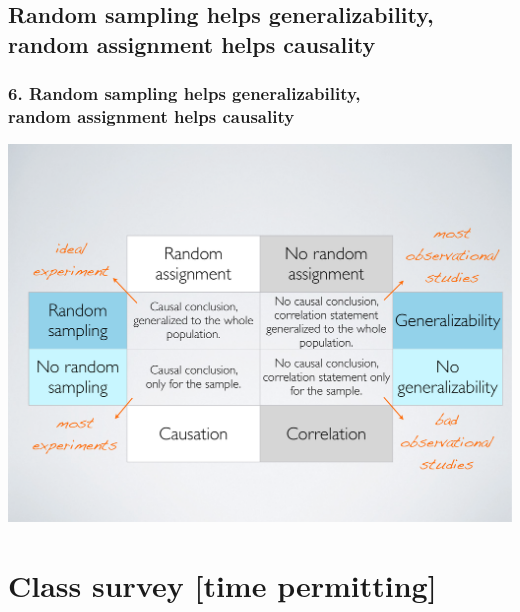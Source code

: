 \documentclass[slidestop,compress,mathserif,12pt,t,professionalfonts,xcolor=table]{beamer}
\begin{document}

\subsection{Random sampling helps generalizability, random assignment helps causality}
\label{mi6}


\begin{frame}
\frametitle{6. Random sampling helps generalizability,\\ random assignment helps 
causality}

\begin{center}
\includegraphics[width=\textwidth]{figures/random_sample_assignment}
\end{center}


\end{frame}


\section{Class survey [time permitting]}
\end{document}
